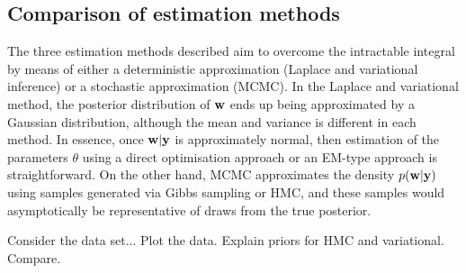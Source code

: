 \subsection{Comparison of estimation methods}


The three estimation methods described aim to overcome the intractable integral by means of either a deterministic approximation (Laplace and variational inference) or a stochastic approximation (MCMC).
In the Laplace and variational method, the posterior distribution of ${\mathbf w}$ ends up being approximated by a Gaussian distribution, although the mean and variance is different in each method.
In essence, once ${\mathbf w}|{\mathbf y}$ is approximately normal, then estimation of the parameters $\theta$ using a direct optimisation approach or an EM-type approach is straightforward.
On the other hand, MCMC approximates the density $p({\mathbf w}|{\mathbf y})$ using samples generated via Gibbs sampling or HMC, and these samples would asymptotically be representative of draws from the true posterior.

Consider the data set...
Plot the data. Explain priors for HMC and variational. Compare.



